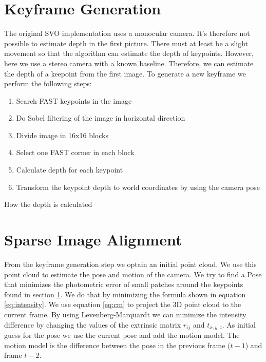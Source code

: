 \documentclass[11pt,a4paper,titlepage,oneside]{report}
\begin{document}
\section{Keyframe Generation}\label{sec:initialization}
The original SVO implementation uses a monocular camera. It's therefore not possible to estimate depth in the first picture. There must at least be a slight movement so that the algorithm can estimate the depth of keypoints. However, here we use a stereo camera with a known baseline. Therefore, we can estimate the depth of a keepoint from the first image. To generate a new keyframe we perform the following steps:
\begin{enumerate}
	\item{Search FAST keypoints in the image}
	\item{Do Sobel filtering of the image in horizontal direction}
	\item{Divide image in 16x16 blocks}
	\item{Select one FAST corner in each block}
	\item{Calculate depth for each keypoint}
	\item{Transform the keypoint depth to world coordinates by using the camera pose}
\end{enumerate}

How the depth is calculated 

\section{Sparse Image Alignment}\label{sec:sia}

From the keyframe generation step we optain an initial point cloud. We use this point cloud to estimate the pose and motion of the camera. We try to find a Pose that minimizes the photometric error of small patches around the keypoints found in section \ref{sec:initialization}. We do that by minimizing the formula shown in equation \ref{eq:intensity}. We use equation \ref{eq:cm} to project the 3D point cloud to the current frame. By using Levenberg-Marquardt we can minimize the intensity difference by changing the values of the extrinsic matrix $r_{ij}$ and $t_{x,y,z}$. As initial guess for the pose we use the current pose and add the motion model. The motion model is the difference between the pose in the previous frame ($t-1$) and frame $t-2$.
\end{document}
